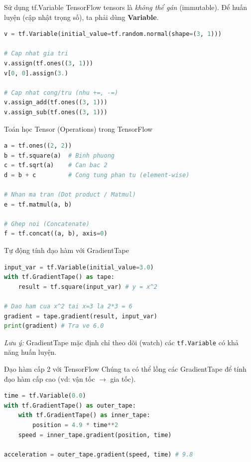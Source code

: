 \documentclass[aspectratio=169]{beamer}
\begin{document}
\begin{frame}[fragile]{Sử dụng tf.Variable}
    TensorFlow tensors là \textit{không thể gán} (immutable). Để huấn luyện (cập nhật trọng số), ta phải dùng \textbf{Variable}.
    \begin{lstlisting}[language=Python]
v = tf.Variable(initial_value=tf.random.normal(shape=(3, 1)))

# Cap nhat gia tri
v.assign(tf.ones((3, 1)))
v[0, 0].assign(3.)

# Cap nhat cong/tru (nhu +=, -=)
v.assign_add(tf.ones((3, 1)))
v.assign_sub(tf.ones((3, 1)))
    \end{lstlisting}
\end{frame}

\begin{frame}[fragile]{Toán học Tensor (Operations) trong TensorFlow}
    \begin{lstlisting}[language=Python]
a = tf.ones((2, 2))
b = tf.square(a)  # Binh phuong
c = tf.sqrt(a)    # Can bac 2
d = b + c         # Cong tung phan tu (element-wise)

# Nhan ma tran (Dot product / Matmul)
e = tf.matmul(a, b)

# Ghep noi (Concatenate)
f = tf.concat((a, b), axis=0)
    \end{lstlisting}
\end{frame}

\begin{frame}[fragile]{Tự động tính đạo hàm với GradientTape}
    \begin{lstlisting}[language=Python]
input_var = tf.Variable(initial_value=3.0)
with tf.GradientTape() as tape:
    result = tf.square(input_var) # y = x^2
    
# Dao ham cua x^2 tai x=3 la 2*3 = 6
gradient = tape.gradient(result, input_var)
print(gradient) # Tra ve 6.0
    \end{lstlisting}
    \textit{Lưu ý:} GradientTape mặc định chỉ theo dõi (watch) các \texttt{tf.Variable} có khả năng huấn luyện.
\end{frame}

\begin{frame}[fragile]{Đạo hàm cấp 2 với TensorFlow}
    Chúng ta có thể lồng các GradientTape để tính đạo hàm cấp cao (vd: vận tốc $\rightarrow$ gia tốc).
    \begin{lstlisting}[language=Python]
time = tf.Variable(0.0)
with tf.GradientTape() as outer_tape:
    with tf.GradientTape() as inner_tape:
        position = 4.9 * time**2
    speed = inner_tape.gradient(position, time)
    
acceleration = outer_tape.gradient(speed, time) # 9.8
    \end{lstlisting}
\end{frame}
\end{document}
